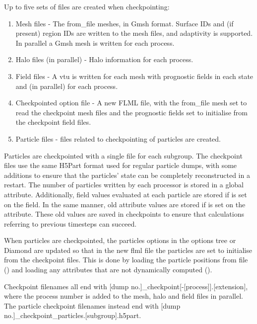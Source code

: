 Up to five sets of files are created when checkpointing:
\begin{enumerate}
\item Mesh files - The from\_file meshes, in Gmsh format. Surface IDs
  and (if present) region IDs are written to the mesh files, and adaptivity
  is supported. In parallel a Gmsh mesh is written for each process.
\item Halo files (in parallel) - Halo information for each process.
\item Field files - A vtu is written for each mesh with prognostic fields in
  each state and (in parallel) for each process.
\item Checkpointed option file - A new FLML file, with the from\_file mesh
  set to read the checkpoint mesh files and the prognostic fields set
  to initialise from the checkpoint field files.
\item Particle files - files related to checkpointing of
  particles are created.
\end{enumerate}

Particles are checkpointed with a single file for each subgroup. The
checkpoint files use the same H5Part format used for regular particle
dumps, with some additions to ensure that the particles' state can be
completely reconstructed in a restart. The number of particles written
by each processor is stored in a global attribute. Additionally, field
values evaluated at each particle are stored if
 is set on
the field. In the same manner, old attribute values are stored if
 is set on the attribute. These old
values are saved in checkpoints to ensure that calculations referring
to previous timesteps can succeed.

When particles are checkpointed, the particles options in the options
tree or Diamond are updated so that in the new flml file the particles
are set to initialise from the checkpoint files. This is done by
loading the particle positions from file
() and loading
any attributes that are not dynamically computed
().

Checkpoint filenames all end with [dump
  no.]\_checkpoint[-[process]].[extension], where the process number
is added to the mesh, halo and field files in parallel. The
particle checkpoint filenames instead end with [dump
  no.]\_checkpoint\_particles.[subgroup].h5part.

